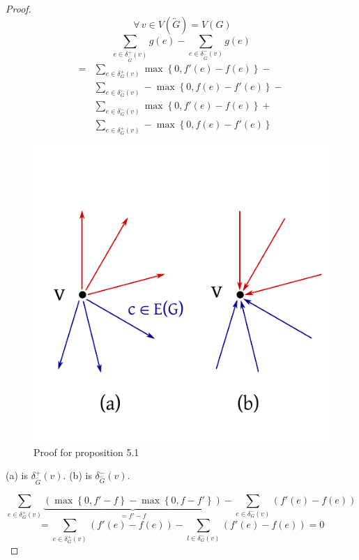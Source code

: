 \documentclass{article}
\newcommand{\set}[1]{\left\{#1\right\}}
\newcommand{\fall}{\;\forall\,}
\begin{document}
\begin{proof}
  \[ \fall v \in V(\overleftrightarrow{G}) = V(G) \]
  \begin{equation*}
    \sum_{e \in \delta^+_{\overleftrightarrow{G}}(v)} g(e) - \sum_{e \in \delta^-_{\overleftrightarrow{G}}(v)} g(e)
  \end{equation*} \begin{align*}
    = &\sum_{e \in \delta^+_{G}(v)} \max\set{0, f'(e) - f(e)} - \\
      &\sum_{e \in \delta^-_G(v)} -\max\set{0, f(e) - f'(e)} - \\
      &\sum_{e \in \delta^-_G(v)} \max\set{0, f'(e) - f(e)} + \\
      &\sum_{e \in \delta^+_G(v)} -\max\set{0, f(e) - f'(e)}
  \end{align*}

  \begin{figure}[ht]
   \begin{center}
    \includegraphics{img/proposition_5_1_proof.pdf}
    \caption{Proof for proposition 5.1}
   \end{center}
  \end{figure}

  (a) is $\delta^+_{\overleftrightarrow{G}}(v)$. (b) is $\delta^-_{\overleftrightarrow{G}}(v)$.

  \[
    \sum_{e \in \delta^+_G(v)} \underbrace{\left(\max\set{0, f' - f} - \max\set{0, f - f'}\right)}_{= f' - f} - \sum_{e \in \delta^-_G(v)} \left(f'(e) - f(e)\right)
  \] \[
      = \sum_{e \in \delta^+_G(v)} \left(f'(e) - f(e)\right) - \sum_{l \in \delta^-_G(v)} \left(f'(e) - f(e)\right)
      = 0
  \]


\end{proof}
\end{document}

